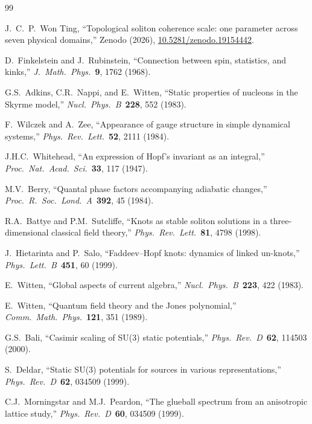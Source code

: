 \documentclass[a4paper,12pt]{article}
\begin{document}
\begin{thebibliography}{99}

 J.~C.~P.~Won Ting,
 ``Topological soliton coherence scale: one parameter across seven physical domains,''
 Zenodo (2026), \href{https://doi.org/10.5281/zenodo.19154442}{10.5281/zenodo.19154442}.

 D.~Finkelstein and J.~Rubinstein,
 ``Connection between spin, statistics, and kinks,''
 \emph{J.\ Math.\ Phys.}\ \textbf{9}, 1762 (1968).

 G.S.~Adkins, C.R.~Nappi, and E.~Witten,
 ``Static properties of nucleons in the Skyrme model,''
 \emph{Nucl.\ Phys.\ B}\ \textbf{228}, 552 (1983).

 F.~Wilczek and A.~Zee,
 ``Appearance of gauge structure in simple dynamical systems,''
 \emph{Phys.\ Rev.\ Lett.}\ \textbf{52}, 2111 (1984).

 J.H.C.~Whitehead,
 ``An expression of Hopf's invariant as an integral,''
 \emph{Proc.\ Nat.\ Acad.\ Sci.}\ \textbf{33}, 117 (1947).

 M.V.~Berry,
 ``Quantal phase factors accompanying adiabatic changes,''
 \emph{Proc.\ R.\ Soc.\ Lond.\ A}\ \textbf{392}, 45 (1984).

 R.A.~Battye and P.M.~Sutcliffe,
 ``Knots as stable soliton solutions in a three-dimensional
 classical field theory,''
 \emph{Phys.\ Rev.\ Lett.}\ \textbf{81}, 4798 (1998).

 J.~Hietarinta and P.~Salo,
 ``Faddeev--Hopf knots: dynamics of linked un-knots,''
 \emph{Phys.\ Lett.\ B}\ \textbf{451}, 60 (1999).

 E.~Witten,
 ``Global aspects of current algebra,''
 \emph{Nucl.\ Phys.\ B}\ \textbf{223}, 422 (1983).

 E.~Witten,
 ``Quantum field theory and the Jones polynomial,''
 \emph{Comm.\ Math.\ Phys.}\ \textbf{121}, 351 (1989).

 G.S.~Bali,
 ``Casimir scaling of SU(3) static potentials,''
 \emph{Phys.\ Rev.\ D}\ \textbf{62}, 114503 (2000).

 S.~Deldar,
 ``Static SU(3) potentials for sources in various representations,''
 \emph{Phys.\ Rev.\ D}\ \textbf{62}, 034509 (1999).

 C.J.~Morningstar and M.J.~Peardon,
 ``The glueball spectrum from an anisotropic lattice study,''
 \emph{Phys.\ Rev.\ D}\ \textbf{60}, 034509 (1999).


\end{thebibliography}
\end{document}
